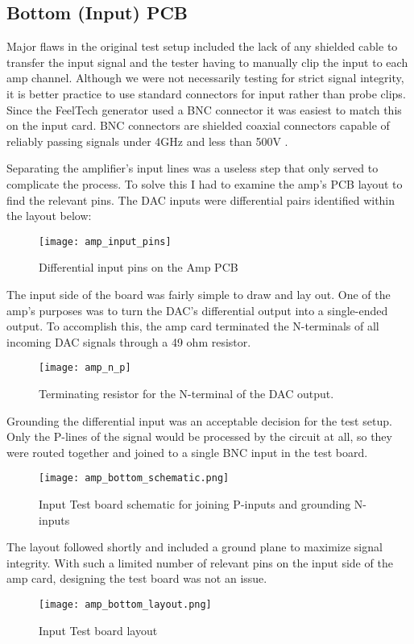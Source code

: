 \subsection{Bottom (Input) PCB}
Major flaws in the original test setup included the lack of any shielded cable to transfer the input signal and the tester having to manually clip the input to each amp channel. Although we were not necessarily testing for strict signal integrity, it is better practice to use standard connectors for input rather than probe clips. Since the FeelTech generator used a BNC connector it was easiest to match this on the input card. BNC connectors are shielded coaxial connectors capable of reliably passing signals under 4GHz and less than 500V \cite{bncbook}. \par
Separating the amplifier's input lines was a useless step that only served to complicate the process. To solve this I had to examine the amp's PCB layout to find the relevant pins. The DAC inputs were differential pairs identified within the layout below:
\begin{figure}[!htb]
	\centering
	\texttt{[image: amp\_input\_pins]}
	\caption{Differential input pins on the Amp PCB}
\end{figure}
The input side of the board was fairly simple to draw and lay out. One of the amp's purposes was to turn the DAC's differential output into a single-ended output. To accomplish this, the amp card terminated the N-terminals of all incoming DAC signals through a 49 ohm resistor.
\begin{figure}[!htb]
	\centering
	\texttt{[image: amp\_n\_p]}
	\caption{Terminating resistor for the N-terminal of the DAC output.}
\end{figure}
Grounding the differential input was an acceptable decision for the test setup. Only the P-lines of the signal would be processed by the circuit at all, so they were routed together and joined to a single BNC input in the test board.
\begin{figure}[!htb]
	\centering
	\texttt{[image: amp\_bottom\_schematic.png]}
	\caption{Input Test board schematic for joining P-inputs and grounding N-inputs}
\end{figure}
The layout followed shortly and included a ground plane to maximize signal integrity. With such a limited number of relevant pins on the input side of the amp card, designing the test board was not an issue. \par
\begin{figure}[!htb]
	\centering
	\texttt{[image: amp\_bottom\_layout.png]}
	\caption{Input Test board layout}
\end{figure}
